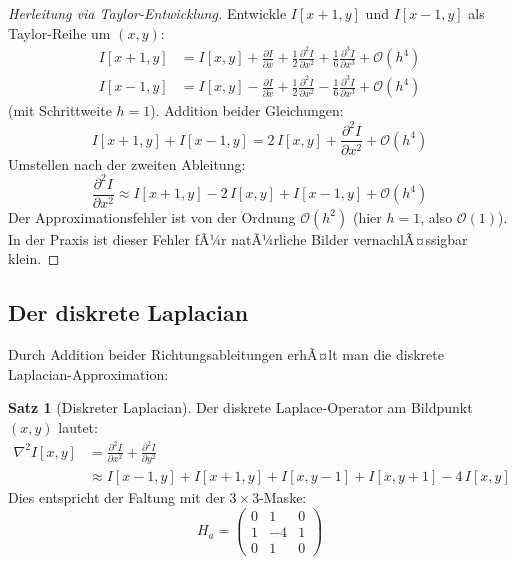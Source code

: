 ﻿\documentclass[a4paper,12pt]{article}
\theoremstyle{definition}
\newtheorem{satz}{Satz}
\begin{document}
\begin{proof}[Herleitung via Taylor-Entwicklung]
    Entwickle $I[x+1,y]$ und $I[x-1,y]$ als Taylor-Reihe um $(x,y)$:
    \begin{align*}
        I[x+1,y] &= I[x,y] + \frac{\partial I}{\partial x} + \frac{1}{2}\frac{\partial^2 I}{\partial x^2}
                    + \frac{1}{6}\frac{\partial^3 I}{\partial x^3} + \mathcal{O}(h^4) \\
        I[x-1,y] &= I[x,y] - \frac{\partial I}{\partial x} + \frac{1}{2}\frac{\partial^2 I}{\partial x^2}
                    - \frac{1}{6}\frac{\partial^3 I}{\partial x^3} + \mathcal{O}(h^4)
    \end{align*}
    (mit Schrittweite $h=1$). Addition beider Gleichungen:
    \[
        I[x+1,y] + I[x-1,y] = 2\,I[x,y] + \frac{\partial^2 I}{\partial x^2} + \mathcal{O}(h^4)
    \]
    Umstellen nach der zweiten Ableitung:
    \[
        \frac{\partial^2 I}{\partial x^2} \approx I[x+1,y] - 2\,I[x,y] + I[x-1,y] + \mathcal{O}(h^4)
    \]
    Der Approximationsfehler ist von der Ordnung $\mathcal{O}(h^2)$ (hier $h=1$, also $\mathcal{O}(1)$).
    In der Praxis ist dieser Fehler fÃ¼r natÃ¼rliche Bilder vernachlÃ¤ssigbar klein. \qedhere
\end{proof}

\subsection{Der diskrete Laplacian}

Durch Addition beider Richtungsableitungen erhÃ¤lt man die diskrete Laplacian-Approximation:

\begin{satz}[Diskreter Laplacian]
\label{satz:diskret}
    Der diskrete Laplace-Operator am Bildpunkt $(x,y)$ lautet:
    \begin{align}
        \nabla^2 I[x,y] &= \frac{\partial^2 I}{\partial x^2} + \frac{\partial^2 I}{\partial y^2}
        \nonumber \\
        &\approx I[x-1,y] + I[x+1,y] + I[x,y-1] + I[x,y+1] - 4\,I[x,y]
        \label{eq:laplacian}
    \end{align}
    Dies entspricht der Faltung mit der $3\times3$-Maske:
    \[
        H_a = \begin{pmatrix} 0 & 1 & 0 \\ 1 & -4 & 1 \\ 0 & 1 & 0 \end{pmatrix}
    \]
\end{satz}
\end{document}
